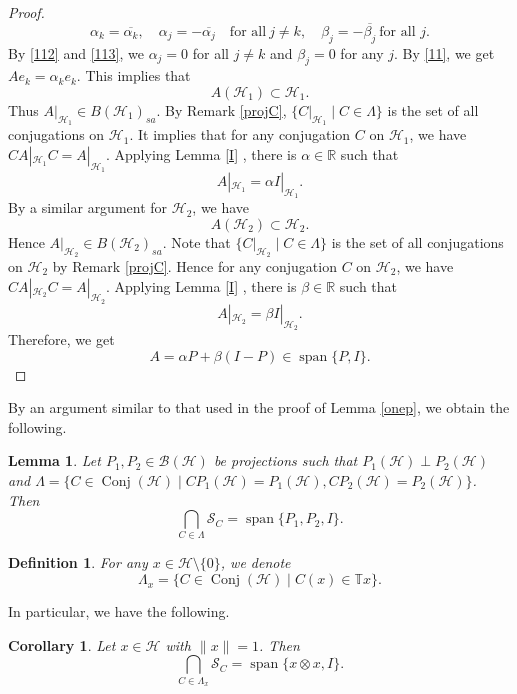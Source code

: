 \documentclass[11pt]{amsart}
\newtheorem{lemma}[theorem]{Lemma}
\newtheorem{cor}[theorem]{Corollary}
\newtheorem{definition}[theorem]{Definition}
\theoremstyle{remark}
\newcommand{\BH}{\mathcal{B(H)}}
\newcommand{\cH}{{\mathcal{H}}}
\newcommand{\SC}{\mathcal{S}_C}
\newcommand{\Conj}{\operatorname{Conj}(\cH)}
\newcommand{\Span}{\operatorname{span}}
\begin{document}
\begin{proof}
\begin{equation}
\alpha_k=\overline{\alpha_k}, \quad  \alpha_j=-\overline{\alpha_j } \quad \text{for all} \ j \neq k , \quad \beta_j=-\overline{\beta_j} \  \text{for all } j.
\end{equation}
By \eqref{112} and \eqref{113}, we $\alpha_j=0$ for all  $j \neq k$ and $\beta_j=0$  for any $ j $. By \eqref{11}, we get
$Ae_k= \alpha_k e_k$.
This implies that 
\begin{equation}\label{ch1}
A(\cH_1) \subset \cH_1.
\end{equation}
Thus $A|_{\cH_1} \in  B(\cH_1)_{sa}$. By Remark \ref{projC}, $\{ C|_{\cH_1} \mid C \in \Lambda \}$ is the set of all conjugations on $\cH_1$. It implies that for any conjugation $C$ on $\cH_1$, we have $CA|_{\cH_1}C=A|_{\cH_1}$. Applying  Lemma \ref{I} , there is $\alpha \in \mathbb{R}$ such that 
\[
A|_{\cH_1} =\alpha I|_{\cH_1}.
\] 
By a similar argument for $\cH_2$,  we have 
\begin{equation}\label{ch2}
A(\cH_2) \subset \cH_2.
\end{equation}
Hence $A|_{\cH_2} \in  B(\cH_2)_{sa}$. 
Note that $\{ C|_{\cH_2} \mid C \in \Lambda \}$ is the set of all conjugations on $\cH_2$ by Remark \ref{projC}. Hence for any conjugation $C$ on $\cH_2$, we have $CA|_{\cH_2}C=A|_{\cH_2}$. Applying  Lemma \ref{I} , there is $\beta \in \mathbb{R}$ such that 
\[
A|_{\cH_2} =\beta I|_{\cH_2}.
\]
Therefore, we get 
\[
A=\alpha P+\beta (I-P) \in \Span \{P, I\}.
\] 
\end{proof}
By an argument similar to that used in the proof of Lemma \ref{onep}, we obtain the following.
\begin{lemma}\label{twop}
    Let $P_1, P_2 \in \BH$ be projections such that $P_1(\cH) \perp P_2(\cH)$ and $\Lambda=\{ C \in \Conj \mid CP_1(\cH)=P_1(\cH), CP_2(\cH)=P_2(\cH)\}$. Then 
    \[
     \bigcap_{C \in \Lambda} \SC =\Span\{ P_1, P_2, I\}.
    \]
\end{lemma}
\begin{definition}
  For any $x \in \cH \setminus \{0\} $, %
we denote 
\[
\Lambda_{x}=\{ C \in \Conj \mid C(x) \in \mathbb{T}x\}.
\]  
\end{definition}


In particular, we have the following.
\begin{cor}\label{dim2o}
Let $x \in \cH$ with $\|x\|=1$. Then 
\[
\bigcap_{C \in \Lambda_x} \SC=\Span\{x\otimes x, I\}.
\]
\end{cor}
\end{document}

